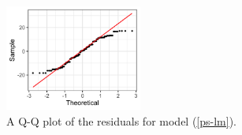 \documentclass[10pt]{article}
\begin{document}
\begin{itemize}
    \begin{figure}
        \centering
        \includegraphics[width = 0.4\textwidth]{img/ps-qqnorm.png}
        \caption{A Q-Q plot of the residuals for model (\ref{ps-lm}).}
        \label{ps-qqplot}
    \end{figure}
\end{itemize}

\end{document}
